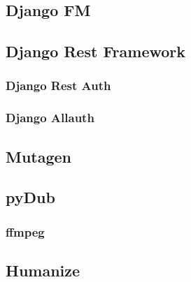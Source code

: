 \subsection{Django FM}

\subsection{Django Rest Framework}

\subsubsection{Django Rest Auth}

\subsubsection{Django Allauth}

\subsection{Mutagen}

\subsection{pyDub}

\subsubsection{ffmpeg}

\subsection{Humanize}